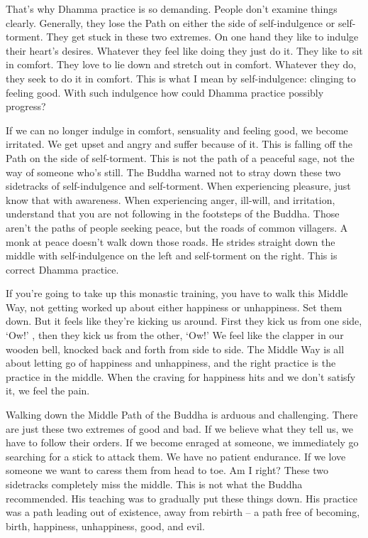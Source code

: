 That's why Dhamma practice is so demanding. People don't examine things clearly. Generally, they lose the Path on either the side of self-in\-dul\-gence or self-torment. They get stuck in these two extremes. On one hand they like to indulge their heart's desires. Whatever they feel like doing they just do it. They like to sit in comfort. They love to lie down and stretch out in comfort. Whatever they do, they seek to do it in comfort. This is what I mean by self-indulgence: clinging to feeling good. With such indulgence how could Dhamma practice possibly progress?

If we can no longer indulge in comfort, sensuality and feeling good, we become irritated. We get upset and angry and suffer because of it. This is falling off the Path on the side of self-torment. This is not the path of a peaceful sage, not the way of someone who's still. The Buddha warned not to stray down these two sidetracks of self-indulgence and self-torment. When experiencing pleasure, just know that with awareness. When experiencing anger, ill-will, and irritation, understand that you are not following in the footsteps of the Buddha. Those aren't the paths of people seeking peace, but the roads of common villagers. A monk at peace doesn't walk down those roads. He strides straight down the middle with self-indulgence on the left and self-torment on the right. This is correct Dhamma practice.

If you're going to take up this monastic training, you have to walk this Middle Way, not getting worked up about either happiness or unhappiness. Set them down. But it feels like they're kicking us around. First they kick us from one side, `Ow!' , then they kick us from the other, `Ow!' We feel like the clapper in our wooden bell, knocked back and forth from side to side. The Middle Way is all about letting go of happiness and unhappiness, and the right practice is the practice in the middle. When the craving for happiness hits and we don't satisfy it, we feel the pain.

Walking down the Middle Path of the Buddha is arduous and challenging. There are just these two extremes of good and bad. If we believe what they tell us, we have to follow their orders. If we become enraged at someone, we immediately go searching for a stick to attack them. We have no patient endurance. If we love someone we want to caress them from head to toe. Am I right? These two sidetracks completely miss the middle. This is not what the Buddha recommended. His teaching was to gradually put these things down. His practice was a path leading out of existence, away from rebirth -- a path free of becoming, birth, happiness, unhappiness, good, and evil.


